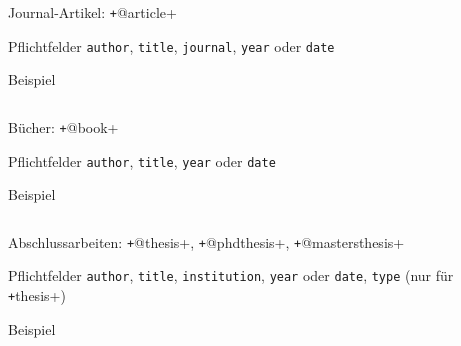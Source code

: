 \begin{frame}[fragile]{Journal-Artikel: \texttt+@article+}
  \begin{block}{Pflichtfelder}
    \texttt{author}, \hspace{2em}
    \texttt{title}, \hspace{2em}
    \texttt{journal}, \hspace{2em}
    \texttt{year} oder \texttt{date}
  \end{block}

  \begin{block}{Beispiel}
    \inputminted[firstline=1, lastline=13]{bibtex}{examples.bib}
  \end{block}

\end{frame}

\begin{frame}[fragile]{Bücher: \texttt+@book+}
  \begin{block}{Pflichtfelder}
    \texttt{author}, \hspace{2em}
    \texttt{title}, \hspace{2em}
    \texttt{year} oder \texttt{date}
  \end{block}

  \begin{block}{Beispiel}
    \inputminted[firstline=15, lastline=22]{bibtex}{examples.bib}
  \end{block}

\end{frame}

\begin{frame}[fragile]{Abschlussarbeiten: \texttt+@thesis+, \texttt+@phdthesis+, \texttt+@mastersthesis+}
  \begin{block}{Pflichtfelder}
    \texttt{author}, \hspace{2em}
    \texttt{title}, \hspace{2em}
    \texttt{institution},  \hspace{2em}
    \texttt{year} oder \texttt{date},  \hspace{2em}
    \texttt{type} (nur für \texttt+thesis+)
  \end{block}

  \begin{block}{Beispiel}
    \inputminted[firstline=24, lastline=35]{bibtex}{examples.bib}
  \end{block}
\end{frame}

